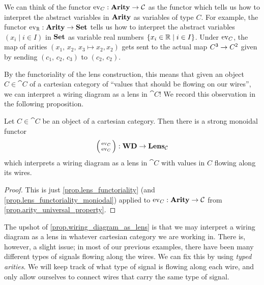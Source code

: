 \documentclass[DynamicalBook]{subfiles}
\begin{document}
We can think of the functor $\mathrm{ev}_C : \textbf{Arity} \to \mathcal{C}$ as the functor
which tells us how to interpret the abstract variables in $\textbf{Arity}$ as variables
of type $C$. For example, the functor $\mathrm{ev}_{\mathbb{R}} : \textbf{Arity} \to \textbf{Set}$ tells
us how to interpret the abstract variables $(x_i \mid i \in I)$ in $\textbf{Set}$ as
variable real numbers $\{x_i \in \mathbb{R} \mid i \in I\}$. Under $\mathrm{ev}_{C}$, the
map of arities $(x_1,\, x_2,\, x_3 \mapsto x_2, x_2)$ gets sent to the actual map
$C^{\mathsf{3}} \to C^{\mathsf{2}}$ given by sending $(c_1,\, c_2,\, c_3)$ to
$(c_2,\, c_2)$.

By the functoriality of the lens construction, this means that given an object
$C \in \cat{C}$ of a cartesian category of ``values that should be flowing on
our wires'', we can interpret a wiring diagram as a lens in $\cat{C}$! We record
this observation in the following proposition. 
\begin{proposition}\label{prop.wiring_diagram_as_lens}
  Let $C \in \cat{C}$ be an object of a cartesian category. Then there is a
  strong monoidal functor
  $$\lens{\Fun{ev}_C}{\Fun{ev}_C} : \Cat{WD} \to \Cat{Lens}_{\cat{C}}$$
  which interprets a wiring diagram as a lens in $\cat{C}$ with values in $C$
  flowing along its wires.
\end{proposition}
\begin{proof}
  This is just \cref{prop.lens_functoriality} (and
  \cref{prop.lens_functoriality_moniodal}) applied to $\mathrm{ev}_C : \textbf{Arity} \to
  \mathcal{C}$ from \cref{prop.arity_universal_property}.
\end{proof}

The upshot of \cref{prop.wiring_diagram_as_lens} is that we may interpret a wiring diagram as a lens in whatever cartesian category we
are working in. There is, however, a slight issue; in most of our previous
examples, there have been many different types of signals flowing along the
wires. We can fix this by using \emph{typed arities}. We will keep track of what
type of signal is flowing along each wire, and only allow ourselves to connect
wires that carry the same type of signal.
\end{document}
